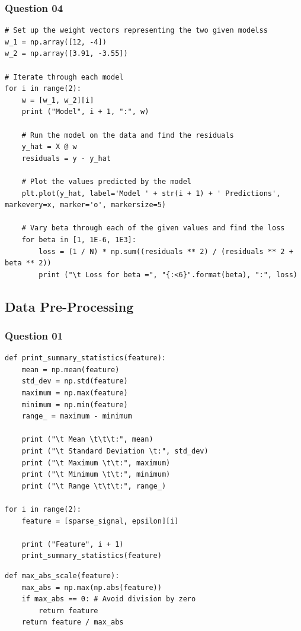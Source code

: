 \documentclass{article}[a4paper]
\begin{document}
	\subsubsection{Question 04}
	\begin{lstlisting}[label={q1_4_code}, caption={Loss Calculation for Different Models and Values of $\beta$}]
# Set up the weight vectors representing the two given modelss
w_1 = np.array([12, -4])
w_2 = np.array([3.91, -3.55])

# Iterate through each model
for i in range(2):
    w = [w_1, w_2][i]
    print ("Model", i + 1, ":", w)

    # Run the model on the data and find the residuals
    y_hat = X @ w
    residuals = y - y_hat

    # Plot the values predicted by the model
    plt.plot(y_hat, label='Model ' + str(i + 1) + ' Predictions', markevery=x, marker='o', markersize=5)

    # Vary beta through each of the given values and find the loss
    for beta in [1, 1E-6, 1E3]:
        loss = (1 / N) * np.sum((residuals ** 2) / (residuals ** 2 + beta ** 2))
        print ("\t Loss for beta =", "{:<6}".format(beta), ":", loss)
	\end{lstlisting}

	\subsection{Data Pre-Processing}

	\subsubsection{Question 01}
	\begin{lstlisting}[label={q3_1_code_1}, caption={Calculation of Summary Statistics}]
def print_summary_statistics(feature):
    mean = np.mean(feature)
    std_dev = np.std(feature)
    maximum = np.max(feature)
    minimum = np.min(feature)
    range_ = maximum - minimum

    print ("\t Mean \t\t\t:", mean)
    print ("\t Standard Deviation \t:", std_dev)
    print ("\t Maximum \t\t:", maximum)
    print ("\t Minimum \t\t:", minimum)
    print ("\t Range \t\t\t:", range_)

for i in range(2):
    feature = [sparse_signal, epsilon][i]

    print ("Feature", i + 1)
    print_summary_statistics(feature)
	\end{lstlisting}

	\begin{lstlisting}[label=q3_1_code_2, caption={Max-Abs Scaling}]
def max_abs_scale(feature):
    max_abs = np.max(np.abs(feature))
    if max_abs == 0: # Avoid division by zero
        return feature
    return feature / max_abs
	\end{lstlisting}
\end{document}

